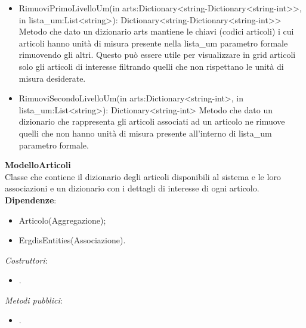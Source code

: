 \begin{itemize}
    \item RimuoviPrimoLivelloUm(in arts:Dictionary<string-Dictionary<string-int>>, in lista\_um:List<string>): Dictionary<string-Dictionary<string-int>>
    Metodo che dato un dizionario arts mantiene le chiavi (codici articoli) i cui articoli hanno unità di misura presente nella lista\_um parametro formale rimuovendo gli altri.
    Questo può essere utile per visualizzare in grid articoli solo gli articoli di interesse filtrando quelli che non rispettano le unità di misura desiderate. 
    \item RimuoviSecondoLivelloUm(in arts:Dictionary<string-int>, in lista\_um:List<string>): Dictionary<string-int>
    Metodo che dato un dizionario che rappresenta gli articoli associati ad un articolo ne rimuove quelli che non hanno unità di misura presente all'interno di lista\_um
    parametro formale.
\end{itemize} 

\textbf{ModelloArticoli}\\
Classe che contiene il dizionario degli articoli disponibili al sistema e le loro associazioni e un dizionario con i dettagli di interesse di ogni articolo.
\textbf{Dipendenze}:
\begin{itemize}
    \item Articolo(Aggregazione);\\
    \item ErgdisEntities(Associazione).
\end{itemize}
\textit{Costruttori}:\\
\begin{itemize}
    \item .\\
\end{itemize}
\textit{Metodi pubblici}:\\
\begin{itemize}
    \item .\\
\end{itemize} 


